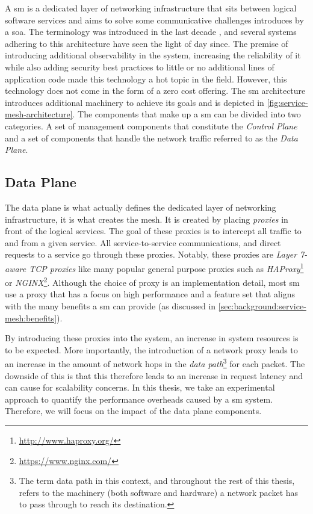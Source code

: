 A \gls{sm} is a dedicated layer of networking infrastructure that sits between logical software services and aims to solve some communicative challenges introduces by a \gls{soa}. The terminology was introduced in the last decade \cite{service-mesh-hype}, and several systems adhering to this architecture have seen the light of day since. The premise of introducing additional observability in the system, increasing the reliability of it while also adding security best practices to little or no additional lines of application code made this technology a hot topic in the field. However, this technology does not come in the form of a zero cost offering. The \gls{sm} architecture introduces additional machinery to achieve its goals and is depicted in \cref{fig:service-mesh-architecture}. The components that make up a \gls{sm} can be divided into two  categories. A set of management components that constitute the \textit{Control Plane} and a set of components that handle the network traffic referred to as the \textit{Data Plane}.

\subsection{Data Plane}
\label{sec:background:service-mesh:data-plane}

The data plane is what actually defines the dedicated layer of networking infrastructure, it is what creates the mesh. It is created by placing \textit{proxies} in front of the logical services. The goal of these proxies is to intercept all traffic to and from a given service. All service-to-service communications, and direct requests to a service go through these proxies. Notably, these proxies are \textit{Layer 7-aware TCP proxies} like many popular general purpose proxies such as \textit{HAProxy}\footnote{\url{http://www.haproxy.org/}} or \textit{NGINX}\footnote{\url{https://www.nginx.com/}}. Although the choice of proxy is an implementation detail, most \gls{sm} use a proxy that has a focus on high performance and a feature set that aligns with the many benefits a \gls{sm} can provide (as discussed in \cref{sec:background:service-mesh:benefits}).

By introducing these proxies into the system, an increase in system resources is to be expected. More importantly, the introduction of a network proxy leads to an increase in the amount of network hops in the \textit{data path}\footnote{The term data path in this context, and throughout the rest of this thesis, refers to the machinery (both software and hardware) a network packet has to pass through to reach its destination.} for each packet. The downside of this is that this therefore leads to an increase in request latency and can cause for scalability concerns. In this thesis, we take an experimental approach to quantify the performance overheads caused by a \gls{sm} system. Therefore, we will focus on the impact of the data plane components.



